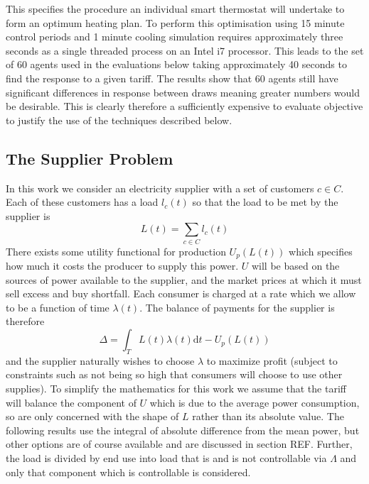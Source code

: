 \documentclass[a4paper, 10 pt, conference]{ieeeconf}  %
\begin{document}
This specifies the procedure an individual smart thermostat will undertake to form an optimum heating plan. To perform this optimisation using 15 minute control periods and 1 minute cooling simulation requires approximately three seconds as a single threaded process on an Intel i7 processor. This leads to the set of 60 agents used in the evaluations below taking approximately 40 seconds to find the response to a given tariff. The results show that 60 agents still have significant differences in response between draws meaning greater numbers would be desirable. This is clearly therefore a sufficiently expensive to evaluate objective to justify the use of the techniques described below.

\subsection{The Supplier Problem}
In this work we consider an electricity supplier with a set of customers $c \in C$. Each of these customers has a load $l_{c}(t)$  so that the load to be met by the supplier is
\begin{equation}
L(t) = \sum_{c \in C} l_{c}(t)
\end{equation}
There exists some utility functional for production $U_{p}(L(t))$ which specifies how much it costs the producer to supply this power. $U$ will be based on the sources of power available to the supplier, and the market prices at which it must sell excess and buy shortfall.
Each consumer is charged at a rate which we allow to be a function of time $\lambda (t)$. The balance of payments for the supplier is therefore
\begin{equation}
\Delta = \int_{T}L(t) \lambda(t) \mathrm{d}t - U_{p}(L(t))
\end{equation}
and the supplier naturally wishes to choose $\lambda$ to maximize profit (subject to constraints such as not being so high that consumers will choose to use other supplies). To simplify the mathematics for this work we assume that the tariff will balance the component of $U$ which is due to the average power consumption, so are only concerned with the shape of $L$ rather than its absolute value. The following results use the integral of absolute difference from the mean power, but other options are of course available and are discussed in section REF.
Further, the load is divided by end use into load that is and is not controllable via $\Lambda$ and only that component which is controllable is considered.
\end{document}
